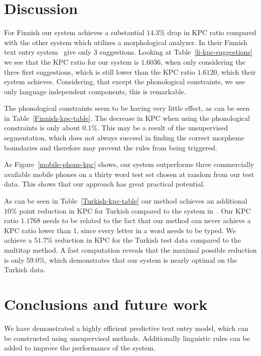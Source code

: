 \documentclass{llncs}
\begin{document}
\section{Discussion}\label{discussion}

For Finnish our system achieves a substantial $14.3\%$ drop in KPC
ratio compared with the other system which utilizes a morphological
analyzer. In their Finnish text entry
system~\cite{silfverberg/2011/cla} give only $3$ suggestions. Looking
at Table~\ref{fi-kpc-suggestions} we see that the KPC ratio for our
system is $1.6036$, when only considering the three first suggestions,
which is still lower than the KPC ratio $1.6120$, which their system
achieves. Considering, that except the phonological constraints, we
use only language independent components, this is remarkable.

The phonological constraints seem to be having very little effect, as
can be seen in Table~\ref{Finnish-kpc-table}. The decrease in KPC when
using the phonological constraints is only about $0.1\%$. This may be
a result of the unsupervised segmentation, which does not always
succeed in finding the correct morpheme boundaries and therefore may
prevent the rules from being triggered.

As Figure~\ref{mobile-phone-kpc} shows, our system outperforms three
commercially available mobile phones on a thirty word test set chosen
at random from our test data. This shows that our approach has great
practical potential.

As can be seen in Table~\ref{Turkish-kpc-table} our method achieves an
additional $10\%$ point reduction in KPC for Turkish compared to the
system in~\cite{Tantug:2010}. Our KPC ratio $1.1768$ needs to be
related to the fact that our method can never achieve a KPC ratio
lower than $1$, since every letter in a word needs to be typed. We
achieve a $51.7\%$ reduction in KPC for the Turkish test data compared
to the multitap method. A fast computation reveals that the maximal
possible reduction is only $59.0\%$, which demonstrates that our
system is nearly optimal on the Turkish data.

\section{Conclusions and future work}\label{conclusion}

We have demonstrated a highly efficient predictive text entry model,
which can be constructed using unsupervised methods. Additionally
linguistic rules can be added to improve the performance of the
system.
\end{document}
